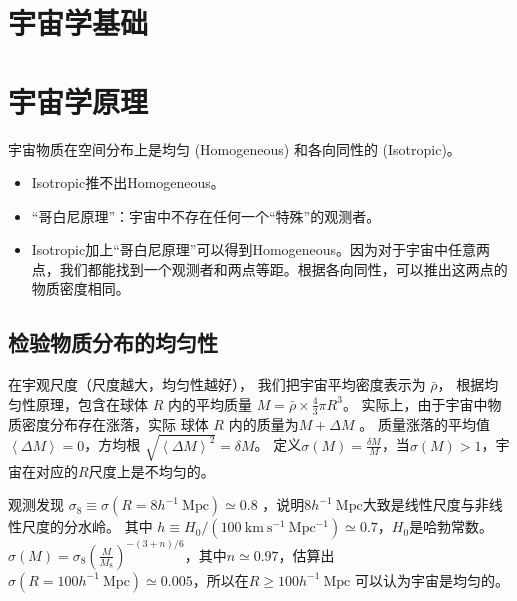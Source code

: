 \documentclass[]{ctexart}
\begin{document}


\section*{宇宙学基础}

\section{宇宙学原理}

宇宙物质在空间分布上是均匀 (Homogeneous) 和各向同性的 (Isotropic)。

\begin{itemize}
	\item Isotropic推不出Homogeneous。
    \item “哥白尼原理”：宇宙中不存在任何一个“特殊”的观测者。
    \item Isotropic加上“哥白尼原理”可以得到Homogeneous。因为对于宇宙中任意两点，我们都能找到一个观测者和两点等距。根据各向同性，可以推出这两点的物质密度相同。
\end{itemize}

\subsection{检验物质分布的均匀性}
在宇观尺度（尺度越大，均匀性越好），
我们把宇宙平均密度表示为 $\bar{\rho}$，
根据均匀性原理，包含在球体 $R$ 内的平均质量 $M=\bar{\rho}\times\frac{4}{3} \pi R^3$。
实际上，由于宇宙中物质密度分布存在涨落，实际 球体 $R$ 内的质量为$M+\Delta M$ 。
质量涨落的平均值 $\left\langle \Delta M \right\rangle = 0$，方均根 $\sqrt{ \left\langle \Delta M \right\rangle ^2 } = \delta M$。
定义$\sigma (M) = \frac{\delta M}{M}$，当$\sigma (M) > 1$，宇宙在对应的$R$尺度上是不均匀的。

观测发现 $\sigma_8 \equiv \sigma(R=8 h^{-1} \mathrm{~Mpc} ) \simeq 0.8$ ，说明$8 h^{-1} \mathrm{~Mpc}$大致是线性尺度与非线性尺度的分水岭。
其中 $h \equiv H_0 / (100 \mathrm{~km~s^{-1}~Mpc^{-1}}) \simeq 0.7$，$H_0$是哈勃常数。
$\sigma(M)=\sigma_{8}\left(\frac{M}{M_{8}}\right)^{-(3+n) / 6}$，其中$n\simeq 0.97$，估算出$\sigma(R=100 h^{-1} \mathrm{~Mpc} ) \simeq 0.005$，所以在$R \ge 100 h^{-1}\mathrm{~Mpc}$ 可以认为宇宙是均匀的。
\end{document}
